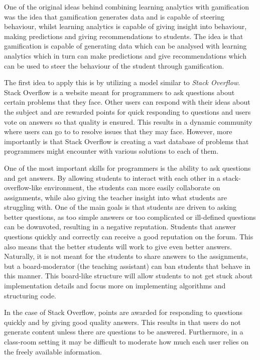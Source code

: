\documentclass[11pt]{article}
\begin{document}
One of the original ideas behind combining learning analytics with gamification was the idea that gamification generates data and is capable of steering behaviour, whilst learning analytics is capable of giving insight into behaviour, making predictions and giving recommendations to students. The idea is that gamification is capable of generating data which can be analysed with learning analytics which in turn can make predictions and give recommendations which can be used to steer the behaviour of the student through gamification. 

The first idea to apply this is by utilizing a model similar to \emph{Stack Overflow}. Stack Overflow is a website meant for programmers to ask questions about certain problems that they face. Other users can respond with their ideas about the subject and are rewarded points for quick responding to questions and users vote on answers so that quality is ensured. This results in a dynamic community where users can go to to resolve issues that they may face. However, more importantly is that Stack Overflow is creating a vast database of problems that programmers might encounter with various solutions to each of them. 

One of the most important skills for programmers is the ability to ask questions and get answers. By allowing students to interact with each other in a stack-overflow-like environment, the students can more easily collaborate on assignments, while also giving the teacher insight into what students are struggling with. One of the main goals is that students are driven to asking better questions, as too simple answers or too complicated or ill-defined questions can be downvoted, resulting in a negative reputation. Students that answer questions quickly and correctly can receive a good reputation on the forum. This also means that the better students will work to give even better answers. Naturally, it is not meant for the students to share answers to the assignments, but a board-moderator (the teaching assistant) can ban students that behave in this manner. This board-like structure will allow students to not get stuck about implementation details and focus more 
on implementing algorithms and structuring code.

In the case of Stack Overflow, points are awarded for responding to questions quickly and by giving good quality answers. This results in that users do not generate content unless there are questions to be answered. Furthermore, in a class-room setting it may be difficult to moderate how much each user relies on the freely available information.
\end{document}
